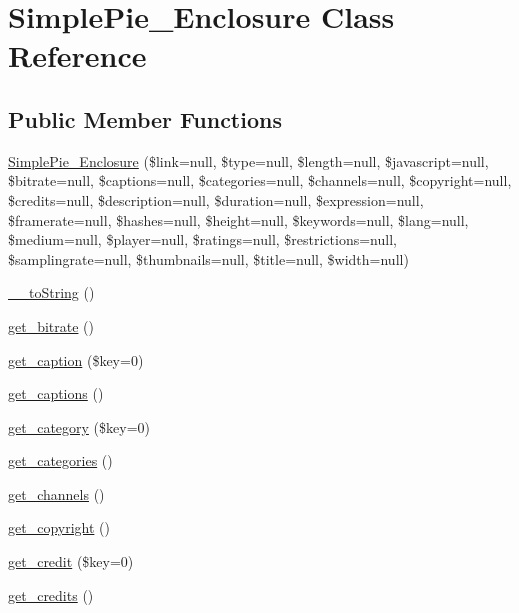 \hypertarget{class_simple_pie___enclosure}{\section{Simple\-Pie\-\_\-\-Enclosure Class Reference}
\label{class_simple_pie___enclosure}
}
\subsection*{Public Member Functions}
\begin{DoxyCompactItemize}
\item 
\hyperlink{class_simple_pie___enclosure_a86a16cb569e6e8ac81e4b90a2671c608}{Simple\-Pie\-\_\-\-Enclosure} (\$link=null, \$type=null, \$length=null, \$javascript=null, \$bitrate=null, \$captions=null, \$categories=null, \$channels=null, \$copyright=null, \$credits=null, \$description=null, \$duration=null, \$expression=null, \$framerate=null, \$hashes=null, \$height=null, \$keywords=null, \$lang=null, \$medium=null, \$player=null, \$ratings=null, \$restrictions=null, \$samplingrate=null, \$thumbnails=null, \$title=null, \$width=null)
\item 
\hyperlink{class_simple_pie___enclosure_ad5ad495ff148919183cc00fdf1665a63}{\-\_\-\-\_\-to\-String} ()
\item 
\hyperlink{class_simple_pie___enclosure_ae57bcb605e3f266c26fbef056129e8b8}{get\-\_\-bitrate} ()
\item 
\hyperlink{class_simple_pie___enclosure_a551927726fca44a96c5f1394d750e8aa}{get\-\_\-caption} (\$key=0)
\item 
\hyperlink{class_simple_pie___enclosure_a287e3ab9257514e57125edbcb24ecd44}{get\-\_\-captions} ()
\item 
\hyperlink{class_simple_pie___enclosure_aef95d62dab342f4f5027bddef42d2d72}{get\-\_\-category} (\$key=0)
\item 
\hyperlink{class_simple_pie___enclosure_a712ec15a4d3a5dc041459271a99cae07}{get\-\_\-categories} ()
\item 
\hyperlink{class_simple_pie___enclosure_ae86404cc2bcc6ffb793b9f9792d267c1}{get\-\_\-channels} ()
\item 
\hyperlink{class_simple_pie___enclosure_a65ddddc0002c1a9fd2e3123e4f309bb0}{get\-\_\-copyright} ()
\item 
\hyperlink{class_simple_pie___enclosure_af9a30c052701cfe024b50214e4682fd9}{get\-\_\-credit} (\$key=0)
\item 
\hyperlink{class_simple_pie___enclosure_af18eccd10c1b4678cfc23ed2a81851ee}{get\-\_\-credits} ()

\end{DoxyCompactItemize}
